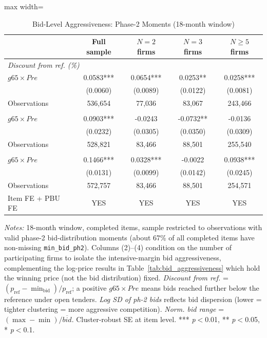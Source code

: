 \begin{table}[htbp]
\centering
\caption{Bid-Level Aggressiveness: Phase-2 Moments (18-month window)}
\label{tab:bid_moments}
\begin{adjustbox}{max width=\textwidth}
\begin{threeparttable}
\small
\begin{tabular}{lcccc}
\toprule
 & Full sample & $N=2$ firms & $N=3$ firms & $N \geq 5$ firms \\
\midrule
\multicolumn{5}{l}{\textit{Discount from ref. (\%)}} \\
$g65 \times Pre$ & 0.0583*** & 0.0654*** & 0.0253** & 0.0258*** \\
 & (0.0060) & (0.0089) & (0.0122) & (0.0081) \\
Observations & 536,654 & 77,036 & 83,067 & 243,466 \\
\addlinespace
\multicolumn{5}{l}{\textit{Log SD of ph-2 bids}} \\
$g65 \times Pre$ & 0.0903*** & -0.0243 & -0.0732** & -0.0136 \\
 & (0.0232) & (0.0305) & (0.0350) & (0.0309) \\
Observations & 528,821 & 83,466 & 88,501 & 255,540 \\
\addlinespace
\multicolumn{5}{l}{\textit{Norm. bid range}} \\
$g65 \times Pre$ & 0.1466*** & 0.0328*** & -0.0022 & 0.0938*** \\
 & (0.0131) & (0.0099) & (0.0142) & (0.0245) \\
Observations & 572,757 & 83,466 & 88,501 & 254,571 \\
\addlinespace
\midrule
Item FE + PBU FE & YES & YES & YES & YES \\
\bottomrule
\end{tabular}
\begin{tablenotes}
\small
\item \textit{Notes:} 18-month window, completed items, sample restricted
to observations with valid phase-2 bid-distribution moments (about 67\% of
all completed items have non-missing \texttt{min\_bid\_ph2}).
Columns (2)--(4) condition on the number of participating firms to isolate
the intensive-margin bid aggressiveness, complementing the log-price
results in Table~\ref{tab:bid_aggressiveness} which hold the winning
price (not the bid distribution) fixed.
\textit{Discount from ref.} = $(p_\text{ref} - \min_\text{bid})/p_\text{ref}$;
a positive $g65 \times Pre$ means bids reached further below the reference
under open tenders. \textit{Log SD of ph-2 bids} reflects bid dispersion
(lower = tighter clustering = more aggressive competition).
\textit{Norm. bid range} = $(\max - \min) / \overline{bid}$.
Cluster-robust SE at item level.
*** \textit{p}$<$0.01, ** \textit{p}$<$0.05, * \textit{p}$<$0.1.
\end{tablenotes}
\end{threeparttable}
\end{adjustbox}
\end{table}
